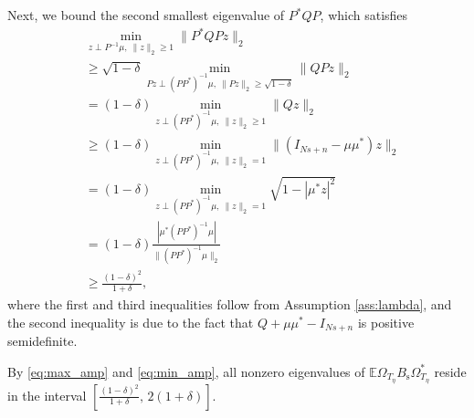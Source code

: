\documentclass[11pt,journal]{IEEEtran}
\newcommand{\bbE}{\mathbb{E}}
\newcommand{\rms}{\mathrm{s}}
\newcommand{\norm}[1]{\|{#1}\|}
\begin{document}
\begin{IEEEproof}
Next, we bound the second smallest eigenvalue of $P^*QP$, which satisfies
\begin{align}
\nonumber & \min_{z\perp P^{-1}\mu,~ \norm{z}_2\geq 1} \norm{P^*QP z}_2 \\
\nonumber & \geq \sqrt{1-\delta}\min_{Pz \perp (PP^*)^{-1}\mu,~ \norm{Pz}_2\geq \sqrt{1-\delta}} \norm{QPz}_2 \\
\nonumber & = (1-\delta)\min_{z\perp (PP^*)^{-1}\mu,~ \norm{z}_2\geq 1} \norm{Qz}_2 \\
\nonumber & \geq (1-\delta)\min_{z\perp (PP^*)^{-1}\mu,~ \norm{z}_2= 1} \norm{(I_{Ns+n} -\mu\mu^*)z}_2 \\
\nonumber & = (1-\delta)\min_{z\perp (PP^*)^{-1}\mu,~ \norm{z}_2= 1}\sqrt{1 - |\mu^*z|^2 } \\
\nonumber & = (1-\delta) \frac{|\mu^* (PP^*)^{-1} \mu|}{\norm{(PP^*)^{-1} \mu}_2} \\
\label{eq:min_amp} & \geq \frac{(1-\delta)^2}{1+\delta},
\end{align}
where the first and third inequalities follow from Assumption \ref{ass:lambda}, and the second inequality is due to the fact that $ Q + \mu\mu^* - I_{Ns+n} $ is positive semidefinite.

By \eqref{eq:max_amp} and \eqref{eq:min_amp}, all nonzero eigenvalues of $\bbE \Omega_{T_\eta} B_\rms \Omega_{T_\eta}^*$ reside in the interval $[\frac{(1-\delta)^2}{1+\delta},\, 2(1+\delta)]$. 
\end{IEEEproof}


\end{document}

